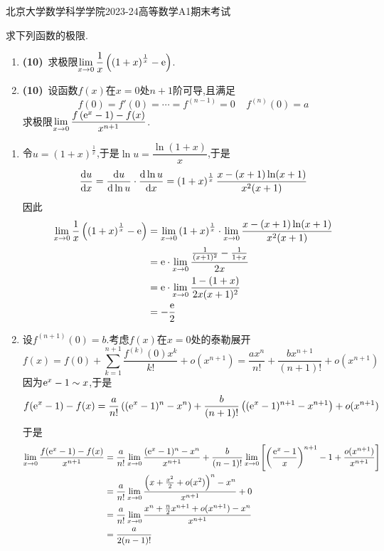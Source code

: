 \documentclass{ctexart}
\begin{document}
\pagestyle{empty}
\begin{center}\Large
    北京大学数学科学学院2023-24高等数学A1期末考试
\end{center}
\begin{problem}[1.(20\songti{分})]
    求下列函数的极限.
    \begin{enumerate}[label=\tbf{(\arabic*)}]
        \item \textbf{(10)}\ 求极限$\displaystyle\lim_{x\to0}\dfrac1x\left(\left(1+x\right)^{\frac1x}-\mathrm{e}\right)$.
        \item \textbf{(10)}\ 设函数$f(x)$在$x=0$处$n+1$阶可导,且满足\[f(0)=f'(0)=\cdots=f^{(n-1)}=0\ \ \ \ \ f^{(n)}(0)=a\]求极限$\displaystyle\lim_{x\to0}\dfrac{f\left(\mathrm{e}^x-1\right)-f(x)}{x^{n+1}}$.
    \end{enumerate}
\end{problem}
\begin{solution}
    \begin{enumerate}[label=\tbf{(\arabic*)}]
        \item 令$u=\left(1+x\right)^{\frac1x}$,于是$\ln u=\dfrac{\ln(1+x)}{x}$,于是
            \[\dfrac{\mathrm{d} u}{\mathrm{d} x}=\dfrac{\mathrm{d} u}{\mathrm{d}\ln u}\cdot\dfrac{\mathrm{d}\ln u}{\mathrm{d} x}=\left(1+x\right)^{\frac1x}\dfrac{x-(x+1)\ln(x+1)}{x^2(x+1)}\]
            因此
            \[\begin{aligned}
                \lim_{x\to0}\dfrac1x\left(\left(1+x\right)^{\frac1x}-\mathrm{e}\right)
                &= \lim_{x\to0}\left(1+x\right)^{\frac1x}\cdot\lim_{x\to0}\dfrac{x-(x+1)\ln(x+1)}{x^2(x+1)} \\
                &= \mathrm{e}\cdot\lim_{x\to0}\dfrac{\frac{1}{(x+1)^2}-\frac{1}{1+x}}{2x} \\
                &= \mathrm{e}\cdot\lim_{x\to0}\dfrac{1-(1+x)}{2x(x+1)^2} \\
                &= -\dfrac{\mathrm{e}}{2}
            \end{aligned}\]
        \item 设$f^{(n+1)}(0)=b$.考虑$f(x)$在$x=0$处的泰勒展开
            \[f(x)=f(0)+\sum_{k=1}^{n+1}\dfrac{f^{(k)}(0)x^k}{k!}+o(x^{n+1})=\dfrac{ax^n}{n!}+\dfrac{bx^{n+1}}{(n+1)!}+o(x^{n+1})\]
            因为$\mathrm{e}^x-1\sim x$,于是
            \[f(\mathrm{e}^x-1)-f(x)=\dfrac{a}{n!}\left((\mathrm{e}^x-1)^n-x^n\right)+\dfrac{b}{(n+1)!}\left((\mathrm{e}^x-1)^{n+1}-x^{n+1}\right)+o(x^{n+1})\]
            于是
            \[\begin{aligned}
                \lim_{x\to0}\dfrac{f(\mathrm{e}^x-1)-f(x)}{x^{n+1}}
                &= \dfrac{a}{n!}\lim_{x\to0}\dfrac{(\mathrm{e}^x-1)^n-x^n}{x^{n+1}}+\dfrac{b}{(n-1)!}\lim_{x\to0}\left[\left(\dfrac{\mathrm{e}^x-1}{x}\right)^{n+1}-1+\dfrac{o(x^{n+1})}{x^{n+1}}\right] \\
                &= \dfrac{a}{n!}\lim_{x\to0}\dfrac{\left(x+\frac{x^2}{2}+o(x^2)\right)^n-x^n}{x^{n+1}}+0 \\
                &= \dfrac{a}{n!}\lim_{x\to0}\dfrac{x^n+\frac{n}{2}x^{n+1}+o(x^{n+1})-x^n}{x^{n+1}} \\
                &= \dfrac{a}{2(n-1)!}
            \end{aligned}\]
    \end{enumerate}
\end{solution}
\end{document}
